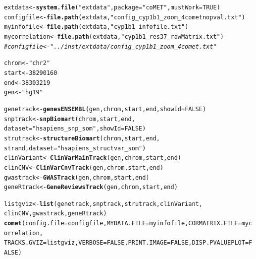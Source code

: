 \documentclass[11pt]{article}\usepackage[]{graphicx}\usepackage[usenames,dvipsnames]{color}
\makeatletter
\newcommand{\hlnum}[1]{\textcolor[rgb]{0.686,0.059,0.569}{#1}}%
\newcommand{\hlstr}[1]{\textcolor[rgb]{0.192,0.494,0.8}{#1}}%
\newcommand{\hlcom}[1]{\textcolor[rgb]{0.678,0.584,0.686}{\textit{#1}}}%
\newcommand{\hlstd}[1]{\textcolor[rgb]{0.345,0.345,0.345}{#1}}%
\newcommand{\hlkwb}[1]{\textcolor[rgb]{0.69,0.353,0.396}{#1}}%
\newcommand{\hlkwc}[1]{\textcolor[rgb]{0.333,0.667,0.333}{#1}}%
\newcommand{\hlkwd}[1]{\textcolor[rgb]{0.737,0.353,0.396}{\textbf{#1}}}%
\newenvironment{kframe}{%
 \def\at@end@of@kframe{}%
 \ifinner\ifhmode%
  \def\at@end@of@kframe{\end{minipage}}%
  \begin{minipage}{\columnwidth}%
 \fi\fi%
 \def\FrameCommand##1{\hskip\@totalleftmargin \hskip-\fboxsep
 \colorbox{shadecolor}{##1}\hskip-\fboxsep
     \hskip-\linewidth \hskip-\@totalleftmargin \hskip\columnwidth}%
 \MakeFramed {\advance\hsize-\width
   \@totalleftmargin\z@ \linewidth\hsize
   \@setminipage}}%
 {\par\unskip\endMakeFramed%
 \at@end@of@kframe}
\newenvironment{knitrout}{}{} %
\makeatother
\begin{document}
\begin{knitrout}
\color{fgcolor}\begin{kframe}
\begin{alltt}
\hlstd{extdata} \hlkwb{<-} \hlkwd{system.file}\hlstd{(}\hlstr{"extdata"}\hlstd{,} \hlkwc{package}\hlstd{=}\hlstr{"coMET"}\hlstd{,}\hlkwc{mustWork}\hlstd{=}\hlnum{TRUE}\hlstd{)}
\hlstd{configfile} \hlkwb{<-} \hlkwd{file.path}\hlstd{(extdata,} \hlstr{"config_cyp1b1_zoom_4cometnopval.txt"}\hlstd{)}
\hlstd{myinfofile} \hlkwb{<-} \hlkwd{file.path}\hlstd{(extdata,} \hlstr{"cyp1b1_infofile.txt"}\hlstd{)}
\hlstd{mycorrelation} \hlkwb{<-} \hlkwd{file.path}\hlstd{(extdata,} \hlstr{"cyp1b1_res37_rawMatrix.txt"}\hlstd{)}
\hlcom{#configfile <- "../inst/extdata/config_cyp1b1_zoom_4comet.txt" }

\hlstd{chrom} \hlkwb{<-} \hlstr{"chr2"}
\hlstd{start} \hlkwb{<-} \hlnum{38290160}
\hlstd{end} \hlkwb{<-} \hlnum{38303219}
\hlstd{gen} \hlkwb{<-} \hlstr{"hg19"}

\hlstd{genetrack} \hlkwb{<-}\hlkwd{genesENSEMBL}\hlstd{(gen,chrom,start,end,}\hlkwc{showId}\hlstd{=}\hlnum{FALSE}\hlstd{)}
\hlstd{snptrack} \hlkwb{<-} \hlkwd{snpBiomart}\hlstd{(chrom, start, end,}
                       \hlkwc{dataset}\hlstd{=}\hlstr{"hsapiens_snp_som"}\hlstd{,}\hlkwc{showId}\hlstd{=}\hlnum{FALSE}\hlstd{)}
\hlstd{strutrack} \hlkwb{<-} \hlkwd{structureBiomart}\hlstd{(chrom, start, end,}
                              \hlstd{strand,} \hlkwc{dataset}\hlstd{=}\hlstr{"hsapiens_structvar_som"}\hlstd{)}
\hlstd{clinVariant}\hlkwb{<-}\hlkwd{ClinVarMainTrack}\hlstd{(gen,chrom,start,end)}
\hlstd{clinCNV}\hlkwb{<-}\hlkwd{ClinVarCnvTrack}\hlstd{(gen,chrom,start,end)}
\hlstd{gwastrack} \hlkwb{<-}\hlkwd{GWASTrack}\hlstd{(gen,chrom,start,end)}
\hlstd{geneRtrack} \hlkwb{<-}\hlkwd{GeneReviewsTrack}\hlstd{(gen,chrom,start,end)}

\hlstd{listgviz} \hlkwb{<-} \hlkwd{list}\hlstd{(genetrack,snptrack,strutrack,clinVariant,}
                 \hlstd{clinCNV,gwastrack,geneRtrack)}
\hlkwd{comet}\hlstd{(}\hlkwc{config.file}\hlstd{=configfile,} \hlkwc{MYDATA.FILE}\hlstd{=myinfofile,} \hlkwc{CORMATRIX.FILE}\hlstd{=mycorrelation,}
      \hlkwc{TRACKS.GVIZ}\hlstd{=listgviz,} \hlkwc{VERBOSE}\hlstd{=}\hlnum{FALSE}\hlstd{,} \hlkwc{PRINT.IMAGE}\hlstd{=}\hlnum{FALSE}\hlstd{,}\hlkwc{DISP.PVALUEPLOT}\hlstd{=}\hlnum{FALSE}\hlstd{)}
\end{alltt}
\end{kframe}
\end{knitrout}
\end{document}
